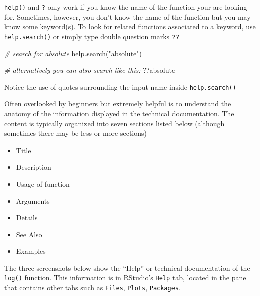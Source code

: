 \documentclass[
]{book}
\newenvironment{Shaded}{\begin{snugshade}}{\end{snugshade}}
\newcommand{\CommentTok}[1]{\textcolor[rgb]{0.56,0.35,0.01}{\textit{#1}}}
\newcommand{\FunctionTok}[1]{\textcolor[rgb]{0.00,0.00,0.00}{#1}}
\newcommand{\NormalTok}[1]{#1}
\newcommand{\StringTok}[1]{\textcolor[rgb]{0.31,0.60,0.02}{#1}}
\providecommand{\tightlist}{%
  \setlength{\itemsep}{0pt}\setlength{\parskip}{0pt}}
\begin{document}
\texttt{help()} and \texttt{?} only work if you know the name of the function your are
looking for. Sometimes, however, you don't know the name of the function but
you may know some keyword(s). To look for related functions associated to a
keyword, use \texttt{help.search()} or simply type double question marks \texttt{??}

\begin{Shaded}
\begin{Highlighting}[]
\CommentTok{\# search for \textquotesingle{}absolute\textquotesingle{}}
\FunctionTok{help.search}\NormalTok{(}\StringTok{"absolute"}\NormalTok{)}

\CommentTok{\# alternatively you can also search like this:}
\NormalTok{??absolute}
\end{Highlighting}
\end{Shaded}

Notice the use of quotes surrounding the input name inside \texttt{help.search()}

Often overlooked by beginners but extremely helpful is to understand the
anatomy of the information displayed in the technical documentation. The
content is typically organized into seven sections listed below (although
sometimes there may be less or more sections)

\begin{itemize}
\tightlist
\item
  Title
\item
  Description
\item
  Usage of function
\item
  Arguments
\item
  Details
\item
  See Also
\item
  Examples
\end{itemize}

The three screenshots below show the ``Help'' or technical documentation of the
\texttt{log()} function. This information is in RStudio's \texttt{Help} tab, located in the
pane that contains other tabs such as \texttt{Files}, \texttt{Plots}, \texttt{Packages}.
\end{document}
